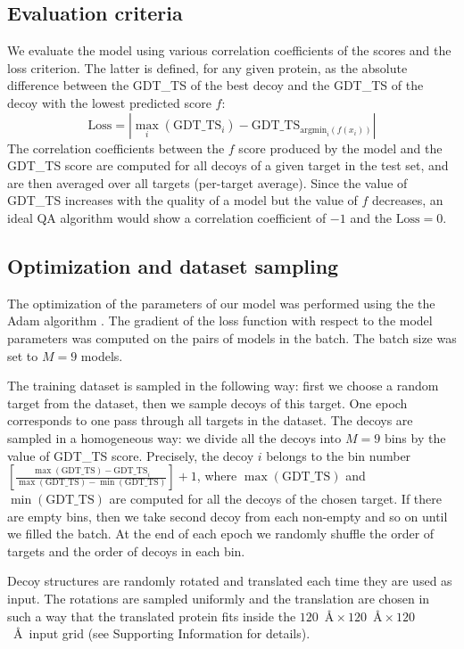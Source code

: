 \subsection{Evaluation criteria}
We evaluate the model using various correlation coefficients of the
scores and the loss criterion. The latter is defined, for any given protein, as
the absolute difference between the GDT\_TS of the best decoy and the
GDT\_TS of the decoy with the lowest predicted score $f$:
$$ 
\text{Loss} = \left| \max_i( \text{GDT\_TS}_i ) - \text{GDT\_TS}_{\mathrm{argmin}_i(f(x_i))} \right|
$$
%
The correlation coefficients between the $f$ score produced by the
model and the GDT\_TS score are computed for all decoys of a given
target in the test set, and are then averaged over all
targets (per-target average). Since the value of GDT\_TS increases with the quality of a
model but the value of $f$ decreases, an ideal QA algorithm would show a
correlation coefficient of $-1$ and the $\text{Loss} = 0$.


\subsection{Optimization and dataset sampling}
The optimization of the parameters of our model was performed
using the the Adam algorithm \cite{kingma2014adam}. The gradient of the loss 
function with respect to the model parameters was computed on the pairs of 
models in the batch. The batch size was set to $M = 9$ models.

The training dataset is sampled in the following way: first we choose a
random target from the dataset, then we sample decoys of this
target. One epoch corresponds to one pass through all targets in the
dataset. The decoys are sampled in a homogeneous way: we divide all
the decoys into $M = 9$ bins by the value of GDT\_TS score.
Precisely, the decoy $i$ belongs to the bin number $ \left[
  \frac{\max(\text{GDT\_TS}) - \text{GDT\_TS}_i}{\max(\text{GDT\_TS})
    - \min(\text{GDT\_TS})} \right] + 1$, where $\max(\text{GDT\_TS})$
and $\min(\text{GDT\_TS})$ are computed for all the decoys of the
chosen target. If there are empty bins, then we take second decoy
from each non-empty and so on until we filled the batch. At the end
of each epoch we randomly shuffle the order of targets and the order
of decoys in each bin.

Decoy structures are randomly rotated and translated each time they
are used as input. The rotations are sampled uniformly
\cite{shoemake1992uniform} and the translation are chosen in such a
way that the translated protein fits inside the $120$~\AA${}\times
120$~\AA${}\times 120$~\AA\ input grid (see Supporting Information for details).

